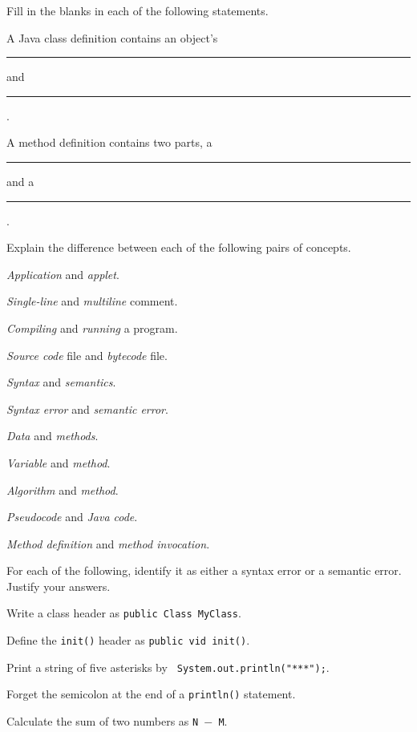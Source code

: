 \newpage
\label{exercises}
\label{exercises}
\label{exercises}
\begin{EXRtwo}

\item  Fill in the blanks in each of the following statements.
\begin{EXRtwoLL}
\baselineskip=14pt\item  A Java class definition contains an object's 
\rule{20pt}{0.5pt}  and
\rule{20pt}{0.5pt}.
\item  A method definition contains two parts, a \rule{20pt}{0.5pt} 
and a \rule{20pt}{0.5pt}.
\end{EXRtwoLL}
\baselineskip=11pt
\item  Explain the difference between each of the following pairs of
concepts.

\begin{EXRtwoLL}
\item  {\it Application} and {\it applet}.
\item  {\it Single-line} and {\it multiline} comment.
\item  {\it Compiling} and {\it running} a program.
\item  {\it Source code} file and {\it bytecode} file.
\item  {\it Syntax} and {\it semantics}.
\item  {\it Syntax error} and {\it semantic error}.
\item  {\it Data} and {\it methods}.
\item  {\it Variable} and {\it method}.
\item  {\it Algorithm} and {\it method}.
\item  {\it Pseudocode} and {\it Java code}.
\item  {\it Method definition} and {\it method invocation}.
\end{EXRtwoLL}

\item  For each of the following, identify it as either a
syntax error or a semantic error.  Justify your answers.

\begin{EXRtwoLL}
\item  Write a class header as {\tt public Class MyClass}.
\item  Define the {\tt init()} header as {\tt public vid init()}.
\item  Print a string of five asterisks by {\tt 
System.out.println("***");}.
\item  Forget the semicolon at the end of a {\tt println()} statement.
\item  Calculate the sum of two numbers as {\tt N $-$ M}.
\end{EXRtwoLL}


\end{EXRtwo}
